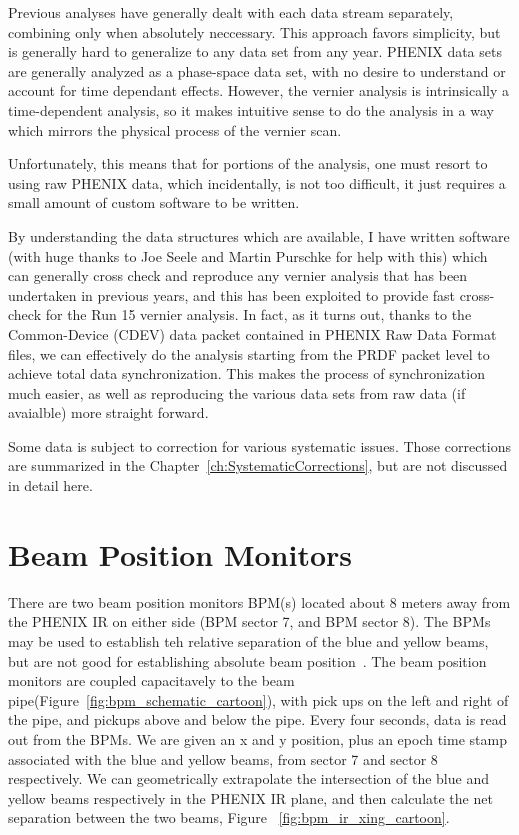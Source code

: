 Previous analyses have generally dealt with each data stream separately,
combining only when absolutely neccessary. This approach favors simplicity, but
is generally hard to generalize to any data set from any year. PHENIX data sets
are generally analyzed as a phase-space data set, with no desire to understand
or account for time dependant effects.  However, the vernier analysis is
intrinsically a time-dependent analysis, so it makes intuitive sense to do the
analysis in a way which mirrors the physical process of the vernier scan.

Unfortunately, this means that for portions of the analysis, one must resort to
using raw PHENIX data, which incidentally, is not too difficult, it just
requires a small amount of custom software to be written.

By understanding the data structures which are available, I have written
software (with huge thanks to Joe Seele and Martin Purschke for help with this)
which can generally cross check and reproduce any vernier analysis that has been
undertaken in previous years, and this has been exploited to provide fast
cross-check for the Run 15 vernier analysis. In fact, as it turns out, thanks to
the Common-Device (CDEV) data packet contained in PHENIX Raw Data Format files,
we can effectively do the analysis starting from the PRDF packet level to
achieve total data synchronization. This makes the process of synchronization
much easier, as well as reproducing the various data sets from raw data (if
avaialble) more straight forward. 

Some data is subject to correction for various systematic issues. Those
corrections are summarized in the Chapter~\ref{ch:SystematicCorrections}, but
are not discussed in detail here.

\section{Beam Position Monitors}
There are two beam position monitors BPM(s) located about 8 meters away from the
PHENIX IR on either side (BPM sector 7, and BPM sector 8). The BPMs may be used
to establish teh relative separation of the blue and yellow beams, but are not
good for establishing absolute beam position~\cite{Drees2013}.  The beam
position monitors are coupled capacitavely to the beam
pipe(Figure~\ref{fig:bpm_schematic_cartoon}), with pick ups on the left and
right of the pipe, and pickups above and below the pipe. Every four seconds,
data is read out from the BPMs. We are given an x and y position, plus an epoch
time stamp associated with the blue and yellow beams, from sector 7 and sector 8
respectively. We can geometrically extrapolate the intersection of the blue and
yellow beams respectively in the PHENIX IR plane, and then calculate the net
separation between the two beams, Figure
~\ref{fig:bpm_ir_xing_cartoon}.

